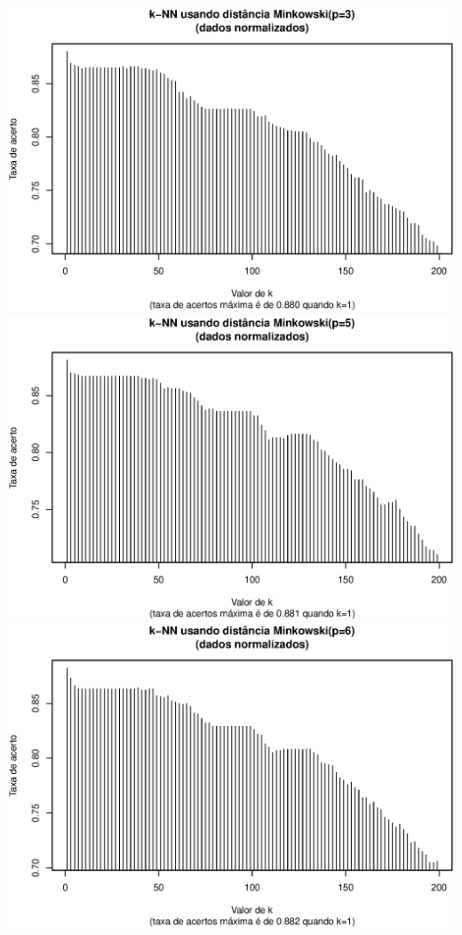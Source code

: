 \documentclass[10pt,a4paper,twocolumn]{article}
\begin{document}
      \includegraphics[scale=0.33]{graficos/minkowski_3_1.ps}
      \includegraphics[scale=0.33]{graficos/minkowski_5_1.ps}
      \includegraphics[scale=0.33]{graficos/minkowski_6_1.ps}
\end{document}
